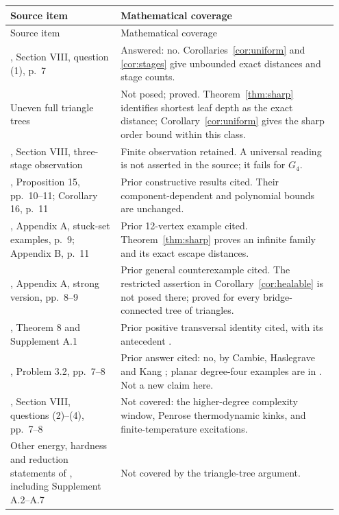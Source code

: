 \documentclass[11pt]{article}
\begin{document}
\renewcommand{\arraystretch}{1.12}
\begin{longtable}{@{}p{0.32\linewidth}p{0.63\linewidth}@{}}
\toprule
Source item & Mathematical coverage \\
\midrule
\endfirsthead
\toprule
Source item & Mathematical coverage \\
\midrule
\endhead
\cite{CYKKW}, Section VIII, question (1), p.~7 &
Answered: no. Corollaries~\ref{cor:uniform} and \ref{cor:stages}
give unbounded exact distances and stage counts. \\
Uneven full triangle trees &
Not posed; proved. Theorem~\ref{thm:sharp} identifies shortest leaf
depth as the exact distance; Corollary~\ref{cor:uniform} gives the
sharp order bound within this class. \\
\cite{CYKKW}, Section VIII, three-stage observation &
Finite observation retained. A universal reading is not asserted in
the source; it fails for $G_4$. \\
\cite{CYKKW}, Proposition 15, pp.~10--11; Corollary 16, p.~11 &
Prior constructive results cited. Their component-dependent and
polynomial bounds are unchanged. \\
\cite{CYKKW}, Appendix A, stuck-set examples, p.~9; Appendix B, p.~11 &
Prior 12-vertex example cited. Theorem~\ref{thm:sharp} proves an
infinite family and its exact escape distances. \\
\cite{CYKKW}, Appendix A, strong version, pp.~8--9 &
Prior general counterexample cited. The restricted assertion in
Corollary~\ref{cor:healable} is not posed there; proved for every
bridge-connected tree of triangles. \\
\cite{CYKKW}, Theorem 8 and Supplement A.1 &
Prior positive transversal identity cited, with its antecedent
\cite[Theorems 1.1 and 4.1]{ABKM}. \\
\cite{ABKM}, Problem 3.2, pp.~7--8 &
Prior answer cited: no, by Cambie, Haslegrave and Kang
\cite{CHK}; planar degree-four examples are in
\cite[Theorem 1.2]{KPS}. Not a new claim here. \\
\cite{CYKKW}, Section VIII, questions (2)--(4), pp.~7--8 &
Not covered: the higher-degree complexity window, Penrose
thermodynamic kinks, and finite-temperature excitations. \\
Other energy, hardness and reduction statements of \cite{CYKKW},
including Supplement A.2--A.7 &
Not covered by the triangle-tree argument. \\
\bottomrule
\end{longtable}
\end{document}
